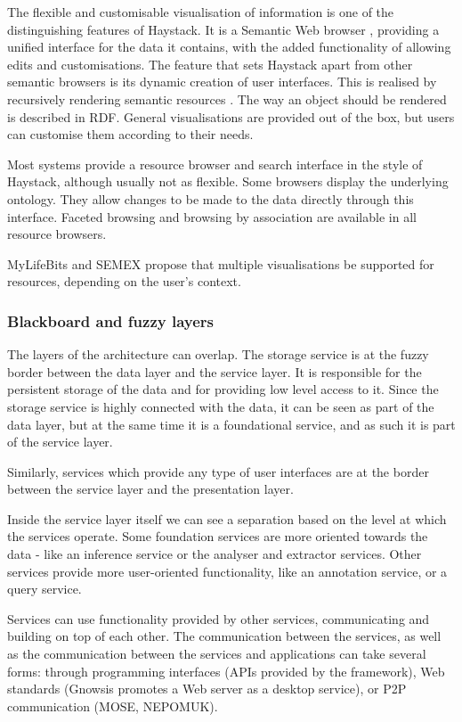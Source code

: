 The flexible and customisable visualisation of information is one of the distinguishing features of Haystack. It is a Semantic Web browser \cite{Quan2004}, providing a unified interface for the data it contains, with the added functionality of allowing edits \cite{Quan2003b} and customisations. The feature that sets Haystack apart from other semantic browsers is its dynamic creation of user interfaces. This is realised by recursively rendering semantic resources \cite{Huynh2003,Karger2005}. The way an object should be rendered is described in RDF. General visualisations are provided out of the box, but users can customise them according to their needs. 

Most systems provide a resource browser and search interface in the style of Haystack, although usually not as flexible. Some browsers display the underlying ontology. They allow changes to be made to the data directly through this interface. 
Faceted browsing and browsing by association are available in all resource browsers.

MyLifeBits and SEMEX propose that multiple visualisations be supported for resources, depending on the user's context.

\subsubsection{Blackboard and fuzzy layers}

The layers of the architecture can overlap.
The storage service is at the fuzzy border between the data layer and the service layer. It is responsible for the persistent storage of the data and for providing low level access to it. Since the storage service is highly connected with the data, it can be seen as part of the data layer, but at the same time it is a foundational service, and as such it is part of the service layer.

Similarly, services which provide any type of user interfaces are at the border between the service layer and the presentation layer.

Inside the service layer itself we can see a separation based on the level at which the services operate. Some foundation services are more oriented towards the data - like an inference service or the analyser and extractor services. Other services provide more user-oriented functionality, like an annotation service, or a query service. 

Services can use functionality provided by other services, communicating and building on top of each other. The communication between the services, as well as the communication between the services and applications can take several forms: through programming interfaces (APIs provided by the framework), Web standards (Gnowsis promotes a Web server as a desktop service), or P2P communication (MOSE, NEPOMUK).

